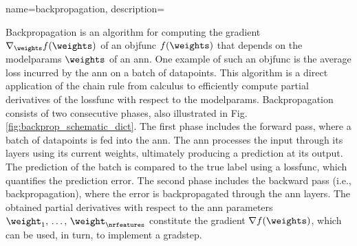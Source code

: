  {name={backpropagation},
 	description={Backpropagation is an \gls{algorithm} for computing the \gls{gradient} 
	 	$\nabla_{\weights} f(\weights)$ of an \gls{objfunc} $f(\weights)$ that depends on the 
	  	\glspl{modelparam} $\weights$ of an \gls{ann}. One example of such an \gls{objfunc} 
	  	is the average \gls{loss} incurred by the \gls{ann} on a \gls{batch} of \glspl{datapoint}. 
	  	This \gls{algorithm} is a direct application of the chain rule from calculus to 
	  	efficiently compute partial derivatives of the \gls{lossfunc} with respect to the \glspl{modelparam}.
		Backpropagation consists of two consecutive phases, also illustrated in Fig. \ref{fig:backprop_schematic_dict}. 
		The first phase includes the forward pass, where a \gls{batch} of 
		\glspl{datapoint} is fed into the \gls{ann}. The \gls{ann} processes the input through its \glspl{layer} using its current 
		\gls{weights}, ultimately producing a \gls{prediction} at its output. The \gls{prediction} of the \gls{batch} is compared to 
	   	the true \gls{label} using a \gls{lossfunc}, which quantifies the \gls{prediction} error. The second phase includes the 
		backward pass (i.e., backpropagation), where the error is backpropagated through the \gls{ann} \glspl{layer}. 
	   	The obtained partial derivatives with respect to the \gls{ann} \glspl{parameter} $\weight_{1},\,\ldots,\,\weight_{\nrfeatures}$ 
	   	constitute the \gls{gradient} $\nabla f(\weights)$, which can be used, in turn, to implement a \gls{gradstep}.
	   	\begin{figure}[H]
		\centering
\end{figure}}}
